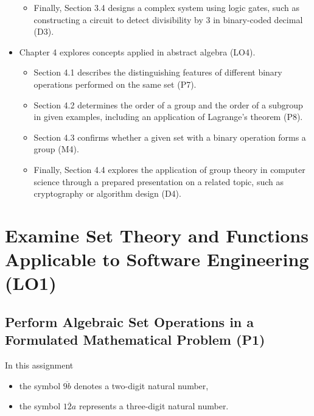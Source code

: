 \documentclass[12pt, a4paper, twoside]{report} %
\renewcommand{\sectionmark}[1]{%
  \markright{\thesection. #1}} %
\begin{document}
\begin{itemize}
\begin{itemize}
    \item Finally, Section 3.4 designs a complex system using logic gates, such as constructing a circuit to detect divisibility by 3 in binary-coded decimal (D3).
  \end{itemize}
  \item Chapter 4 explores concepts applied in abstract algebra (LO4).
  \begin{itemize}
    \item Section 4.1 describes the distinguishing features of different binary operations performed on the same set (P7).
    \item Section 4.2 determines the order of a group and the order of a subgroup in given examples, including an application of Lagrange's theorem (P8).
    \item Section 4.3 confirms whether a given set with a binary operation forms a group (M4).
    \item Finally, Section 4.4 explores the application of group theory in computer science through a prepared presentation on a related topic, such as cryptography or algorithm design (D4).
  \end{itemize}

\end{itemize}




\chapter{Examine Set Theory and Functions Applicable to Software Engineering (LO1)}

\label{chap:LO1}  %

\section{Perform Algebraic Set Operations in a Formulated Mathematical Problem (P1)}
\label{sec:P1}
In this assignment
\begin{itemize}
  \item the symbol $\overline{9b}$ denotes a two-digit natural number,
  \item the symbol $\overline{12a}$ represents a three-digit natural number.
\end{itemize}
\end{document}
